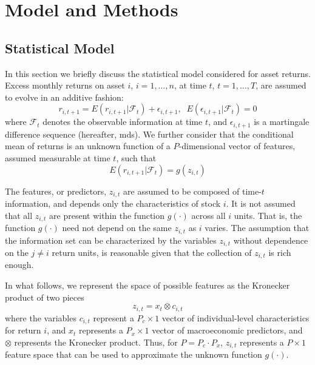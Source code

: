 \documentclass{article}
\begin{document}
\section{Model and Methods}
\subsection{Statistical Model}
In this section we briefly discuss the statistical model considered for asset returns. Excess monthly returns on asset $i$, $i=1,\dots,n$, at time $t$, $t=1,\dots,T$, are assumed to evolve in an additive fashion:
\begin{equation}\label{eq:model}
r_{i, t+1} = E(r_{i, t+1} | \mathcal{F}_t) + \epsilon_{i, t+1},\;\;E(\epsilon_{i, t+1}|\mathcal{F}_{t})=0
\end{equation} where $\mathcal{F}_t$ denotes the observable information at time $t$, and $\epsilon_{i,t+1}$ is a martingale difference sequence (hereafter, mds). We further consider that the conditional mean of returns is an unknown function of a $P$-dimensional vector of features, assumed measurable at time $t$, such that 
\begin{equation}
E(r_{i, t+1} | \mathcal{F}_t) = g(z_{i,t})
\end{equation} 

The features, or predictors, $z_{i,t}$ are assumed to be composed of time-$t$ information, and depends only the characteristics of stock $i$. It is not assumed that all $z_{i,t}$ are present within the function $g(\cdot)$ across all $i$ units. That is, the function $g(\cdot)$ need not depend on the same $z_{i,t}$ as $i$ varies. The assumption that the information set can be characterized by the variables $z_{i,t}$ without dependence on the $j\neq i$ return units, is reasonable given that the collection of $z_{i,t}$ is rich enough. 

In what follows, we represent  the space of possible features as the Kronecker product of two pieces
\begin{equation}
\label{kronecker_equation}
z_{i,t} = x_t \otimes c_{i,t}
\end{equation}where the variables \( c_{i,t} \) represent a \( P_c \times 1 \) vector of individual-level characteristics for return \(i\), and \(x_t\) represents a $P_x \times 1$ vector of macroeconomic predictors, and $\otimes$ represents the Kronecker product. Thus, for $P = P_c\cdot P_x$, $z_{i,t}$ represents a $P \times 1$ feature space that can be used to approximate the unknown function $g(\cdot)$.
\end{document}
